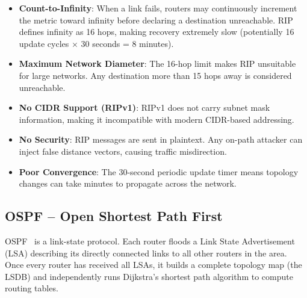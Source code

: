 \documentclass[12pt,a4paper]{article}
\begin{document}
\begin{warningbox}
\begin{itemize}[itemsep=4pt]
  \item \textbf{Count-to-Infinity}: When a link fails, routers may continuously
  increment the metric toward infinity before declaring a destination
  unreachable. RIP defines infinity as 16 hops, making recovery extremely slow
  (potentially 16 update cycles $\times$ 30 seconds = 8 minutes).

  \item \textbf{Maximum Network Diameter}: The 16-hop limit makes RIP unsuitable
  for large networks. Any destination more than 15 hops away is considered
  unreachable.

  \item \textbf{No CIDR Support (RIPv1)}: RIPv1 does not carry subnet mask
  information, making it incompatible with modern CIDR-based addressing.

  \item \textbf{No Security}: RIP messages are sent in plaintext. Any on-path
  attacker can inject false distance vectors, causing traffic misdirection.

  \item \textbf{Poor Convergence}: The 30-second periodic update timer means
  topology changes can take minutes to propagate across the network.
\end{itemize}
\end{warningbox}

\subsection{OSPF -- Open Shortest Path First}

OSPF~\cite{rfc2328,rfc5340} is a link-state protocol. Each router floods a
Link State Advertisement (LSA) describing its directly connected links to all
other routers in the area. Once every router has received all LSAs, it builds a
complete topology map (the LSDB) and independently runs Dijkstra's shortest path
algorithm to compute routing tables.
\end{document}

